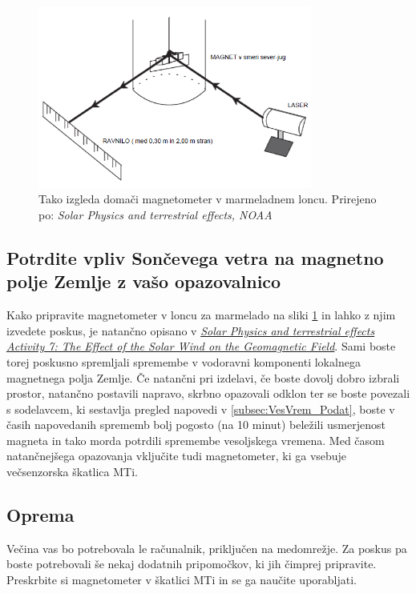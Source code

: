 \begin{figure}
	\centering
	\includegraphics[height=6cm]{Vaje/VesoljVreme/figs/Eksp.png}
	\caption{Tako izgleda domači magnetometer v marmeladnem loncu. Prirejeno po: \textit{Solar Physics and terrestrial effects, NOAA}}
	\label{fig:VesVr_Eksp}       %
\end{figure}
 
\subsection{Potrdite vpliv Sončevega vetra na magnetno polje Zemlje z vašo opazovalnico}
\label{subsec:VesVrem_Posk}
Kako pripravite magnetometer v loncu za marmelado na sliki \ref{fig:VesVr_Eksp} in lahko z njim izvedete poskus, je natančno opisano v \href{http://www.swpc.noaa.gov/sites/default/files/images/u33/Activity_7.pdf}{\textit{Solar Physics and terrestrial effects Activity 7: The Effect of the Solar Wind on the Geomagnetic Field}}. Sami boste torej poskusno spremljali spremembe v vodoravni komponenti lokalnega magnetnega polja Zemlje. Če natančni pri izdelavi, če boste dovolj dobro izbrali prostor, natančno postavili napravo, skrbno opazovali odklon ter se boste povezali s sodelavcem, ki sestavlja pregled napovedi v \ref{subsec:VesVrem_Podat}, boste v časih napovedanih sprememb bolj pogosto (na 10 minut) beležili usmerjenost magneta in tako morda potrdili spremembe vesoljskega vremena. Med časom natančnejšega opazovanja vključite tudi magnetometer, ki ga vsebuje večsenzorska škatlica MTi.


\subsection{Oprema}
\label{subsec:VesVrem_Oprema}
Večina vas bo potrebovala le računalnik, priključen na medomrežje. Za poskus pa boste potrebovali še nekaj dodatnih pripomočkov, ki jih čimprej pripravite. Preskrbite si magnetometer v škatlici MTi in se ga naučite uporabljati.

